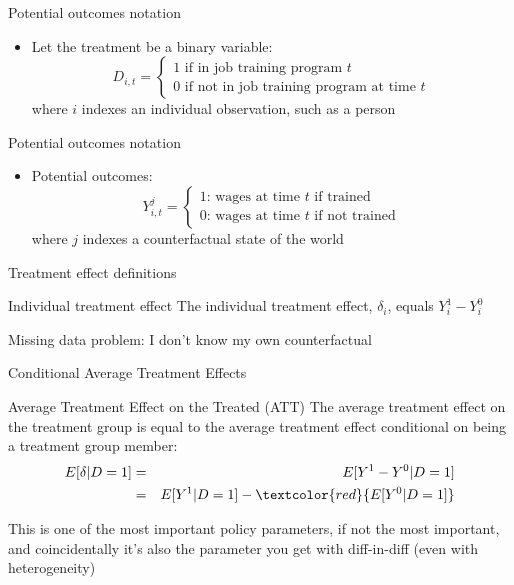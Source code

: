 \documentclass{beamer}
\begin{document}
\begin{frame}{Potential outcomes notation}
	
	\begin{itemize}
	\item Let the treatment be a binary variable: $$D_{i,t} =\begin{cases} 1 \text{ if in job training program $t$} \\ 0 \text{ if not in job training program at time $t$} \end{cases}$$where $i$ indexes an individual observation, such as a person

	\end{itemize}
\end{frame}

\begin{frame}{Potential outcomes notation}
	
	\begin{itemize}

	\item Potential outcomes: $$Y_{i,t}^j =\begin{cases} 1 \text{: wages at time $t$ if trained} \\ 0 \text{: wages at time $t$ if not trained} \end{cases}$$where $j$ indexes a counterfactual state of the world

	\end{itemize}
\end{frame}



\begin{frame}{Treatment effect definitions}


	\begin{block}{Individual treatment effect}
	    The individual treatment effect,  $\delta_i$, equals $Y_i^1-Y_i^0$
	\end{block}

Missing data problem:  I don't know my own counterfactual
	
\end{frame}


\begin{frame}{Conditional Average Treatment Effects}	
	\begin{block}{Average Treatment Effect on the Treated (ATT)}
	The average treatment effect on the treatment group is equal to the average treatment effect conditional on being a treatment group member:
		\begin{eqnarray*}
		E[\delta|D=1]&=&E[Y^1-Y^0|D=1] \nonumber \\
		&=&E[Y^1|D=1]-\textcolor{red}{E[Y^0|D=1]}
		\end{eqnarray*}
	\end{block}
	
	\bigskip

This is one of the most important policy parameters, if not the most important, and coincidentally it's also the parameter you get with diff-in-diff (even with heterogeneity)

	
\end{frame}
\end{document}
